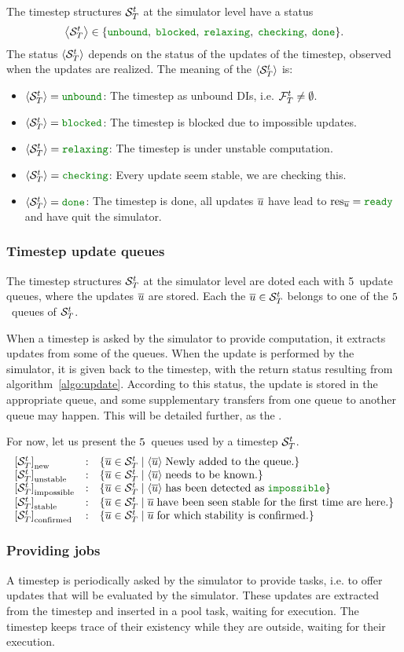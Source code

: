 The timestep structures ${{\cal S}}_{T}^{t}$ at the simulator level have a status $$\cxStatusSet.$$ The status $\left< {{\cal S}}_{T}^{t} \right>$ depends on the status of the updates of the timestep, observed when the updates are realized. The meaning of the $\left< {{\cal S}}_{T}^{t} \right>$ is:
\begin{itemize}
\item $\cxStatusTSUnbound$: The timestep as unbound DIs, i.e. ${{{\cal F}}_{T}^{t}}\neq{\emptyset}$.
\item $\cxStatusTSBlocked$: The timestep is blocked due to impossible updates.
\item $\cxStatusTSRelaxing$: The timestep is under unstable computation.
\item $\cxStatusTSChecking$: Every update seem stable, we are checking this.
\item $\cxStatusTSDone$: The timestep is done, all updates $\overline{u}$ have lead to $\cxResUpdtReady$ and have quit the simulator.
\end{itemize}


\subsubsection{Timestep update queues}

The timestep structures ${{\cal S}}_{T}^{t}$ at the simulator level are doted each with 5~update queues, where the updates $\overline{u}$ are stored. Each the ${\overline{u}}\in{{{\cal S}}_{T}^{t}}$ belongs to one of the $5$~queues of ${{\cal S}}_{T}^{t}$.

When a timestep is asked by the simulator to provide computation, it extracts updates from some of the queues. When the update is performed by the simulator, it is given back to the timestep, with the return status resulting from algorithm~\ref{algo:update}. According to this status, the update is stored in the appropriate queue, and some supplementary transfers from one queue to another queue may happen. This will be detailed further, as the .

For now, let us present the $5$~queues used by a timestep ${{\cal S}}_{T}^{t}$.
\begin{equation}
  \cxQDefs \nonumber
\end{equation}


\subsubsection{Providing jobs \label{sec:providejobs}}

A timestep is periodically asked by the simulator to provide tasks, i.e. to offer updates that will be evaluated by the simulator. These updates are extracted from the timestep and inserted in a pool task, waiting for execution. The timestep keeps trace of their existency while they are outside, waiting for their execution.

